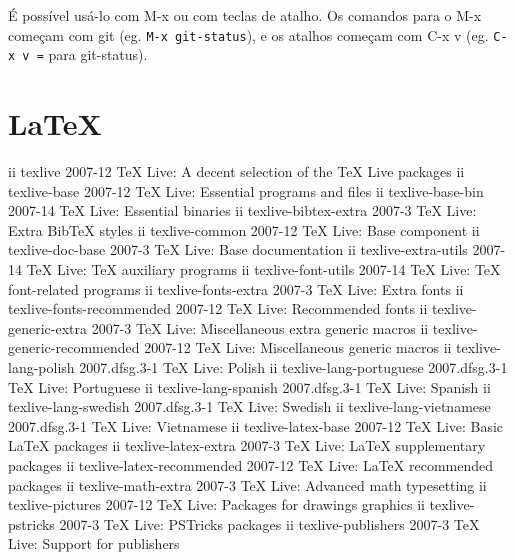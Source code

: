 \documentclass[12pt,brazil]{book}
\begin{document}
É possível usá-lo com M-x ou com teclas de atalho. Os comandos para o
M-x começam com git (eg. \texttt{M-x git-status}), e os atalhos
começam com C-x v (eg. \texttt{C-x v =} para git-status).

\chapter{LaTeX}
\label{cha:latex}

ii  texlive                              2007-12                     TeX Live: A decent selection of the TeX Live packages
ii  texlive-base                         2007-12                     TeX Live: Essential programs and files
ii  texlive-base-bin                     2007-14                     TeX Live: Essential binaries
ii  texlive-bibtex-extra                 2007-3                      TeX Live: Extra BibTeX styles
ii  texlive-common                       2007-12                     TeX Live: Base component
ii  texlive-doc-base                     2007-3                      TeX Live: Base documentation
ii  texlive-extra-utils                  2007-14                     TeX Live: TeX auxiliary programs
ii  texlive-font-utils                   2007-14                     TeX Live: TeX font-related programs
ii  texlive-fonts-extra                  2007-3                      TeX Live: Extra fonts
ii  texlive-fonts-recommended            2007-12                     TeX Live: Recommended fonts
ii  texlive-generic-extra                2007-3                      TeX Live: Miscellaneous extra generic macros
ii  texlive-generic-recommended          2007-12                     TeX Live: Miscellaneous generic macros
ii  texlive-lang-polish                  2007.dfsg.3-1               TeX Live: Polish
ii  texlive-lang-portuguese              2007.dfsg.3-1               TeX Live: Portuguese
ii  texlive-lang-spanish                 2007.dfsg.3-1               TeX Live: Spanish
ii  texlive-lang-swedish                 2007.dfsg.3-1               TeX Live: Swedish
ii  texlive-lang-vietnamese              2007.dfsg.3-1               TeX Live: Vietnamese
ii  texlive-latex-base                   2007-12                     TeX Live: Basic LaTeX packages
ii  texlive-latex-extra                  2007-3                      TeX Live: LaTeX supplementary packages
ii  texlive-latex-recommended            2007-12                     TeX Live: LaTeX recommended packages
ii  texlive-math-extra                   2007-3                      TeX Live: Advanced math typesetting
ii  texlive-pictures                     2007-12                     TeX Live: Packages for drawings graphics
ii  texlive-pstricks                     2007-3                      TeX Live: PSTricks packages
ii  texlive-publishers                   2007-3                      TeX Live: Support for publishers
\end{document}
